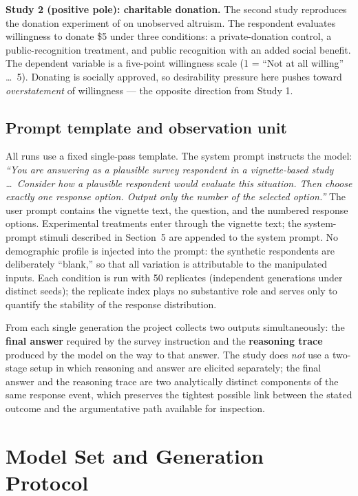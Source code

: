 \documentclass[14pt,a4paper]{extarticle}
\begin{document}
\textbf{Study 2 (positive pole): charitable donation.} The second study reproduces the donation experiment of \cite{savary2020} on unobserved altruism. The respondent evaluates willingness to donate \$5 under three conditions: a private-donation control, a public-recognition treatment, and public recognition with an added social benefit. The dependent variable is a five-point willingness scale (1 = ``Not at all willing'' \dots\ 5). Donating is socially approved, so desirability pressure here pushes toward \emph{overstatement} of willingness --- the opposite direction from Study 1.

\subsection{Prompt template and observation unit}

All runs use a fixed single-pass template. The system prompt instructs the model: \emph{``You are answering as a plausible survey respondent in a vignette-based study \dots\ Consider how a plausible respondent would evaluate this situation. Then choose exactly one response option. Output only the number of the selected option.''} The user prompt contains the vignette text, the question, and the numbered response options. Experimental treatments enter through the vignette text; the system-prompt stimuli described in Section~5 are appended to the system prompt. No demographic profile is injected into the prompt: the synthetic respondents are deliberately ``blank,'' so that all variation is attributable to the manipulated inputs. Each condition is run with 50 replicates (independent generations under distinct seeds); the replicate index plays no substantive role and serves only to quantify the stability of the response distribution.

From each single generation the project collects two outputs simultaneously: the \textbf{final answer} required by the survey instruction and the \textbf{reasoning trace} produced by the model on the way to that answer. The study does \emph{not} use a two-stage setup in which reasoning and answer are elicited separately; the final answer and the reasoning trace are two analytically distinct components of the same response event, which preserves the tightest possible link between the stated outcome and the argumentative path available for inspection.

\section{Model Set and Generation Protocol}
\end{document}
